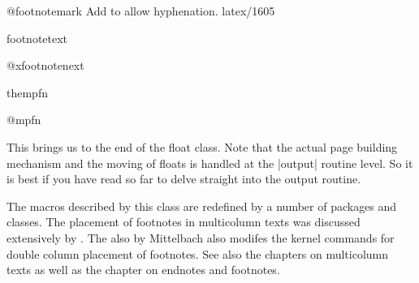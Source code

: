  \begin{docCommand}{@footnotemark} {}
         {Add  to allow hyphenation. latex/1605}
    \begin{teX}
\def\@footnotemark{%
  \leavevmode
  \ifhmode\edef\@x@sf{\the\spacefactor}\nobreak\fi
  \@makefnmark
  \ifhmode\spacefactor\@x@sf\fi
  \relax}
    \end{teX}
 \end{docCommand}
%
 \begin{docCommand}{footnotetext}{}
    \begin{teX}
\def\footnotetext{%
     \@ifnextchar [\@xfootnotenext
       {\protected@xdef\@thefnmark{\thempfn}%
    \@footnotetext}}
    \end{teX}
 \end{docCommand}
%
 \begin{docCommand}{@xfootnotenext}{}
    \begin{teX}
\def\@xfootnotenext[#1]{%
  \begingroup 
     \csname c@\@mpfn\endcsname #1\relax
     \unrestored@protected@xdef\@thefnmark{\thempfn}%
  \endgroup
  \@footnotetext}
    \end{teX}
 \end{docCommand}
%
 \begin{docCommand}{thempfn}{}
 \begin{docCommand}{@mpfn}{}
    \begin{teX}
\def\@mpfn{footnote}
\def\thempfn{\thefootnote}
    \end{teX}
 \end{docCommand}
 \end{docCommand}

This brings us to the end of the float class. Note that the actual page building mechanism and the moving
of floats is handled at the |output| routine level. So it is best if you have read so far to delve straight into the
output routine.

The macros described by this class are redefined by a number of packages and classes. The placement of footnotes in multicolumn texts was discussed extensively by \citeyearpar{mittelbach1990}. The  also by
Mittelbach \citeyearpar{mittelbach2014} also modifes the kernel commands for double column placement of footnotes. See also the chapters on multicolumn texts as well as the chapter on endnotes and footnotes.

